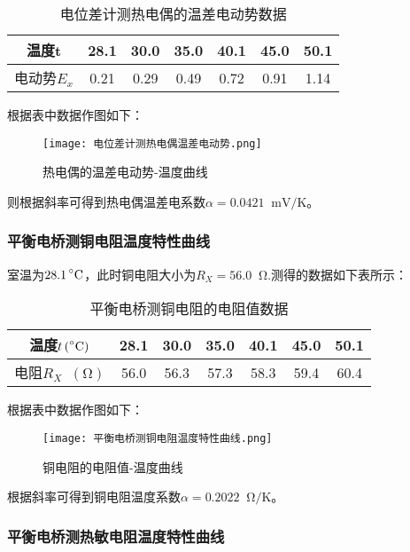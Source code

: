 \documentclass[11pt]{article}
\newcommand*{\unit}[1]{\mathop{}\!\mathrm{#1}}
\newcommand*{\mcelsius}{\unit{\prescript{\circ}{}C}}
\begin{document}
\begin{table}[H]
  \centering
  \caption{电位差计测热电偶的温差电动势数据}
  \begin{tabular}{|c|c|c|c|c|c|c|}
      \hline
      温度t&28.1  & 30.0  & 35.0  & 40.1  & 45.0  & 50.1  \\
      \hline
      电动势$E_x$&0.21  & 0.29  & 0.49  & 0.72  & 0.91  & 1.14 \\
      \hline
  \end{tabular}
\end{table}

根据表中数据作图如下：

\begin{figure}[H]
    \centering
    \texttt{[image: 电位差计测热电偶温差电动势.png]}
    \caption{热电偶的温差电动势-温度曲线}
\end{figure}

则根据斜率可得到热电偶温差电系数$\alpha = 0.0421 \unit{mV/K}$。

\subsubsection{平衡电桥测铜电阻温度特性曲线}

室温为$28.1\mcelsius$，此时铜电阻大小为$R_X=56.0 \unit{\Omega}$.测得的数据如下表所示：

\begin{table}[H]
    \centering
    \caption{平衡电桥测铜电阻的电阻值数据}
    \begin{tabular}{|c|c|c|c|c|c|c|}
        \hline
        温度$t \unit{(\mcelsius)}$&28.1  & 30.0  & 35.0  & 40.1  & 45.0  & 50.1  \\
        \hline
        电阻$R_X \unit{(\Omega)}$&56.0  & 56.3  & 57.3  & 58.3  & 59.4  & 60.4  \\
        \hline
    \end{tabular}
\end{table}

根据表中数据作图如下：

\begin{figure}[H]
    \centering
    \texttt{[image: 平衡电桥测铜电阻温度特性曲线.png]}
    \caption{铜电阻的电阻值-温度曲线}
\end{figure}

根据斜率可得到铜电阻温度系数$\alpha = 0.2022 \unit{\Omega/K}$。

\subsubsection{平衡电桥测热敏电阻温度特性曲线}
\end{document}

